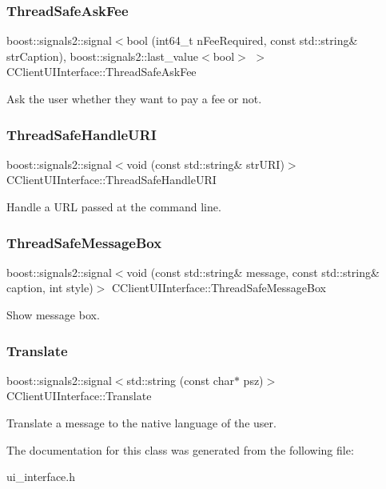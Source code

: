 \subsubsection{\texorpdfstring{ThreadSafeAskFee}{ThreadSafeAskFee}}
{\footnotesize\ttfamily boost\+::signals2\+::signal$<$bool (int64\+\_\+t n\+Fee\+Required, const std\+::string\& str\+Caption), boost\+::signals2\+::last\+\_\+value$<$bool$>$ $>$ C\+Client\+U\+I\+Interface\+::\+Thread\+Safe\+Ask\+Fee}

Ask the user whether they want to pay a fee or not. \mbox{\label{class_c_client_u_i_interface_a307f12eb3aadb694a82eb16714441d75}} 
\subsubsection{\texorpdfstring{ThreadSafeHandleURI}{ThreadSafeHandleURI}}
{\footnotesize\ttfamily boost\+::signals2\+::signal$<$void (const std\+::string\& str\+U\+RI)$>$ C\+Client\+U\+I\+Interface\+::\+Thread\+Safe\+Handle\+U\+RI}

Handle a U\+RL passed at the command line. \mbox{\label{class_c_client_u_i_interface_a5bc5d70a8113304ede47126cb6109e8a}} 
\subsubsection{\texorpdfstring{ThreadSafeMessageBox}{ThreadSafeMessageBox}}
{\footnotesize\ttfamily boost\+::signals2\+::signal$<$void (const std\+::string\& message, const std\+::string\& caption, int style)$>$ C\+Client\+U\+I\+Interface\+::\+Thread\+Safe\+Message\+Box}

Show message box. \mbox{\label{class_c_client_u_i_interface_a996160f65965769cf7fc50e6fd17dc9a}} 
\subsubsection{\texorpdfstring{Translate}{Translate}}
{\footnotesize\ttfamily boost\+::signals2\+::signal$<$std\+::string (const char$\ast$ psz)$>$ C\+Client\+U\+I\+Interface\+::\+Translate}

Translate a message to the native language of the user. 

The documentation for this class was generated from the following file\+:\begin{DoxyCompactItemize}
\item 
ui\+\_\+interface.\+h\end{DoxyCompactItemize}
